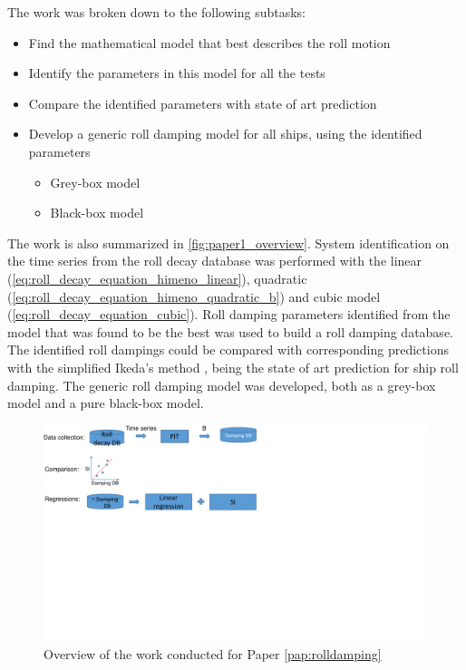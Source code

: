 \noindent The work was broken down to the following subtasks: 
\begin{itemize}
    \item Find the mathematical model that best describes the roll motion
    \item Identify the parameters in this model for all the tests
    \item Compare the identified parameters with state of art prediction
    \item Develop a generic roll damping model for all ships, using the identified parameters
    \begin{itemize}
        \item Grey-box model
        \item Black-box model
    \end{itemize}
\end{itemize}

\noindent The work is also summarized in \autoref{fig:paper1_overview}. System identification on the time series from the roll decay database was performed with the linear (\autoref{eq:roll_decay_equation_himeno_linear}), quadratic (\autoref{eq:roll_decay_equation_himeno_quadratic_b}) and cubic model (\autoref{eq:roll_decay_equation_cubic}). Roll damping parameters identified from the model that was found to be the best was used to build a roll damping database. The identified roll dampings could be compared with corresponding predictions with the simplified Ikeda's method \cite{kawahara_simple_2011}, being the state of art prediction for ship roll damping.
The generic roll damping model was developed, both as a grey-box model and a pure black-box model.
\begin{figure}[!htb]
    \centering
    \includegraphics[width=\linewidth]{kappa/images/workflow.pdf}
    \caption{Overview of the work conducted for Paper \ref{pap:rolldamping}}
    \label{fig:paper1_overview}
\end{figure}

